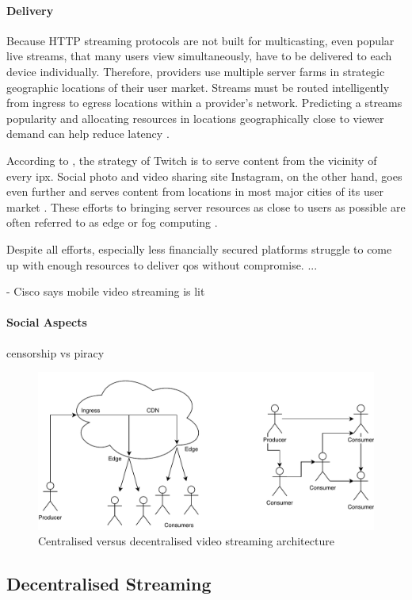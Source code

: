 \paragraph{Delivery}
Because HTTP streaming protocols are not built for multicasting, even popular live streams, that many users view simultaneously, have to be delivered to each device individually. Therefore, providers use multiple server farms \cite{TODO-network-book} in strategic geographic locations of their user market. Streams must be routed intelligently from ingress to egress locations within a provider's network. Predicting a streams popularity and allocating resources in locations geographically close to viewer demand can help reduce latency \cite{TODO}.

According to \citet{TODO}, the strategy of Twitch is to serve content from the vicinity of every \gls{ipx}. Social photo and video sharing site Instagram, on the other hand, goes even further and serves content from locations in most major cities of its user market \cite{TODO}. These efforts to bringing server resources as close to users as possible are often referred to as edge or fog computing \cite{fog-computing, object-store-fog-edge-ipfs}.

Despite all efforts, especially less financially secured platforms struggle to come up with enough resources to deliver \gls{qos} without compromise.
...

- Cisco says mobile video streaming is lit

\paragraph{Social Aspects}
censorship vs piracy

\begin{figure}
\centering
\includegraphics[width=.5\textwidth]{graphics/streaming-types.pdf}
\caption{Centralised versus decentralised video streaming architecture}
\label{fig:pipeline}
\end{figure}

\subsection{Decentralised Streaming}

